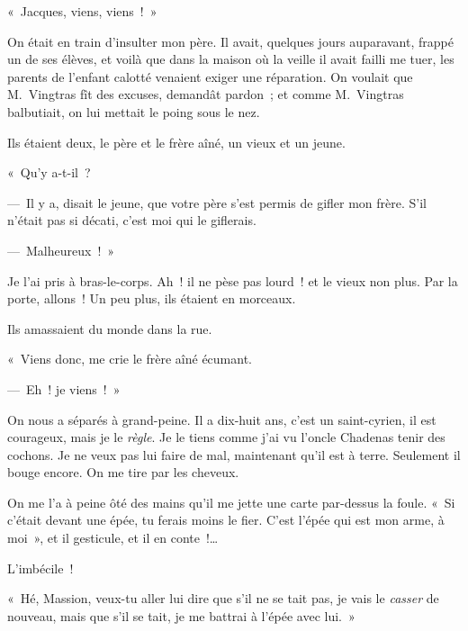 \documentclass[french,twoside]{book} %
\def\mednobreak{\ifdim\lastskip<\medskipamount
  \removelastskip\nopagebreak\medskip\fi}
\newcommand{\labelblock}[1]{\medbreak{\noindent\color{rubric}\bfseries #1}\par\mednobreak}
\begin{document}
« Jacques, viens, viens ! »\par
On était en train d’insulter mon père. Il avait, quelques jours auparavant, frappé un de ses élèves, et voilà que dans la maison où la veille il avait failli me tuer, les parents de l’enfant calotté venaient exiger une réparation. On voulait que M. Vingtras fît des excuses, demandât pardon ; et comme M. Vingtras balbutiait, on lui mettait le poing sous le nez.\par
Ils étaient deux, le père et le frère aîné, un vieux et un jeune.\par
« Qu’y a-t-il ?\par
— Il y a, disait le jeune, que votre père s’est permis de gifler mon frère. S’il n’était pas si décati, c’est moi qui le giflerais.\par
— Malheureux ! »\par
Je l’ai pris à bras-le-corps. Ah ! il ne pèse pas lourd ! et le vieux non plus. Par la porte, allons ! Un peu plus, ils étaient en morceaux.\par
Ils amassaient du monde dans la rue.\par
« Viens donc, me crie le frère aîné écumant.\par
— Eh ! je viens ! »\par
\bigbreak
\noindent On nous a séparés à grand-peine. Il a dix-huit ans, c’est un saint-cyrien, il est courageux, mais je le \emph{règle}. Je le tiens comme j’ai vu l’oncle Chadenas tenir des cochons. Je ne veux pas lui faire de mal, maintenant qu’il est à terre. Seulement il bouge encore. On me tire par les cheveux.\par
On me l’a à peine ôté des mains qu’il me jette une carte par-dessus la foule. « Si c’était devant une épée, tu ferais moins le fier. C’est l’épée qui est mon arme, à moi », et il gesticule, et il en conte !…\par
L’imbécile !\par
« Hé, Massion, veux-tu aller lui dire que s’il ne se tait pas, je vais le \emph{casser} de nouveau, mais que s’il se tait, je me battrai à l’épée avec lui. »\par

\labelblock{Prairie de Mauves, 7 heures du matin.}
\end{document}
